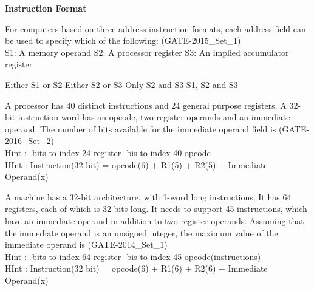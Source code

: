 
\centerline{\textbf{ \LARGE Instruction Format}}

\begin{questyle}
  \question  For computers based on three-address instruction formats, each address field can be used
             to specify which of the following:  (GATE-2015\_Set\_1) \\
             S1: A memory operand \quad S2: A processor register \quad S3: An implied accumulator register

  \begin{oneparchoices}
    \CorrectChoice  Either S1 or S2
    \choice         Either S2 or S3
    \choice         Only S2 and S3
    \choice         S1, S2 and S3
  \end{oneparchoices}
\end{questyle}


\begin{questyle}
  \question  A processor has 40 distinct instructions and 24 general purpose registers.
             A 32-bit instruction word has an opcode, two register operands and an immediate operand.
             The number of bits available for the immediate operand field is \fillin[16] (GATE-2016\_Set\_2)
             \\ Hint : -bits to index 24 register -bis to index 40 opcode
             \\ HInt : \qquad Instruction(32 bit) = opcode(6) + R1(5) + R2(5) + Immediate Operand(x)
\end{questyle}

\begin{questyle}
  \question  A machine has a 32-bit architecture, with 1-word long instructions. It has 64 registers,
             each of which is 32 bits long. It needs to support 45 instructions, which have an immediate
             operand in addition to two register operands. Assuming that the immediate operand is an
             unsigned integer, the maximum value of the immediate operand is
             \fillin[16383 \( \boldsymbol {(2^{14} -1)} \)] (GATE-2014\_Set\_1)
             \\ Hint : -bits to index 64 register -bis to index 45 opcode(instructions)
             \\ HInt : \qquad Instruction(32 bit) = opcode(6) + R1(6) + R2(6) + Immediate Operand(x)
\end{questyle}

